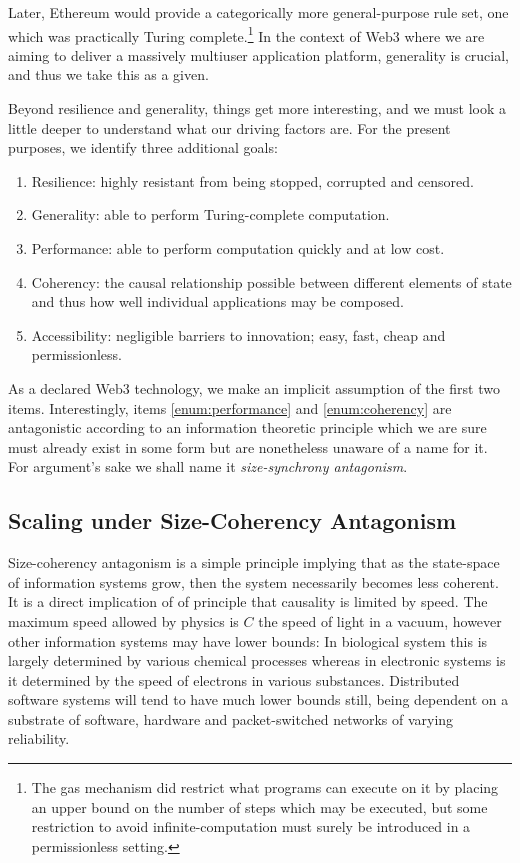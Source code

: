 Later, Ethereum would provide a categorically more general-purpose rule set, one which was practically Turing complete.\footnote{The gas mechanism did restrict what programs can execute on it by placing an upper bound on the number of steps which may be executed, but some restriction to avoid infinite-computation must surely be introduced in a permissionless setting.} In the context of Web3 where we are aiming to deliver a massively multiuser application platform, generality is crucial, and thus we take this as a given.

Beyond resilience and generality, things get more interesting, and we must look a little deeper to understand what our driving factors are. For the present purposes, we identify three additional goals:
\begin{enumerate}
  \item \label{enum:resilience} Resilience: highly resistant from being stopped, corrupted and censored.
  \item \label{enum:generality} Generality: able to perform Turing-complete computation.
  \item \label{enum:performance} Performance: able to perform computation quickly and at low cost.
  \item \label{enum:coherency} Coherency: the causal relationship possible between different elements of state and thus how well individual applications may be composed.
  \item \label{enum:accessibility} Accessibility: negligible barriers to innovation; easy, fast, cheap and permissionless.
\end{enumerate}

As a declared Web3 technology, we make an implicit assumption of the first two items. Interestingly, items \ref{enum:performance} and \ref{enum:coherency} are antagonistic according to an information theoretic principle which we are sure must already exist in some form but are nonetheless unaware of a name for it. For argument's sake we shall name it \emph{size-synchrony antagonism}.

\subsection{Scaling under Size-Coherency Antagonism}

Size-coherency antagonism is a simple principle implying that as the state-space of information systems grow, then the system necessarily becomes less coherent. It is a direct implication of of principle that causality is limited by speed. The maximum speed allowed by physics is $C$ the speed of light in a vacuum, however other information systems may have lower bounds: In biological system this is largely determined by various chemical processes whereas in electronic systems is it determined by the speed of electrons in various substances. Distributed software systems will tend to have much lower bounds still, being dependent on a substrate of software, hardware and packet-switched networks of varying reliability.

